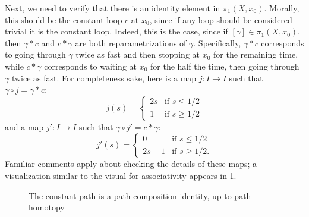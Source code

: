 \documentclass{article}
\theoremstyle{definition}
\theoremstyle{remark}
\numberwithin{figure}{section}
\begin{document}
Next, we need to verify that there is an identity element in $\pi_1(X, x_0)$. Morally, this should be the constant loop $c$ at $x_0$, since if any loop should be considered trivial it is the constant loop. Indeed, this is the case, since if $[\gamma] \in \pi_1(X, x_0)$, then $\gamma * c$ and $c * \gamma$ are both reparametrizations of $\gamma$. Specifically, $\gamma * c$ corresponds to going through $\gamma$ twice as fast and then stopping at $x_0$ for the remaining time, while $c * \gamma$ corresponds to waiting at $x_0$ for the half the time, then going through $\gamma$ twice as fast. For completeness sake, here is a map $j : I \to I$ such that $\gamma \circ j = \gamma * c$:
\[
j(s) = \begin{cases}
	2s & \text{if } s \leq 1/2\\
	1 & \text{if } s \geq 1/2
\end{cases}
\]
and a map $j' : I \to I$ such that $\gamma \circ j' = c * \gamma$:
\[
j'(s) = \begin{cases}
	0 & \text{if } s \leq 1/2\\
	2s - 1 & \text{if } s \geq 1/2.
\end{cases}
\]
Familiar comments apply about checking the details of these maps; a visualization similar to the visual for associativity appears in \cref{fig:constant is identity}.

\begin{figure}[h]
	\centering
	\qquad\qquad\qquad
	\caption{The constant path is a path-composition identity, up to path-homotopy}
	\label{fig:constant is identity}
\end{figure}
\end{document}
